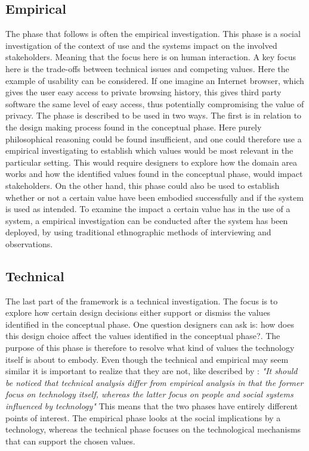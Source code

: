 \subsection{Empirical}
The phase that follows is often the empirical investigation. This phase is a social investigation of the context of use and the systems impact on the involved stakeholders. Meaning that the focus here is on human interaction. A key focus here is the trade-offs between technical issues and competing values. Here the example of usability can be considered. If one imagine an Internet browser, which gives the user easy access to private browsing history, this gives third party software the same level of easy access, thus potentially compromising the value of privacy.\newline
The phase is described to be used in two ways. The first is in relation to the design making process found in the conceptual phase. Here purely philosophical reasoning could be found insufficient, and one could therefore use a empirical investigating to establish which values would be most relevant in the particular setting. This would require designers to explore how the domain area works and how the identified values found in the conceptual phase, would impact stakeholders. \newline
On the other hand, this phase could also be used to establish whether or not a certain value have been embodied successfully and if the system is used as intended. To examine the impact a certain value has in the use of a system, a empirical investigation can be conducted after the system has been deployed, by using traditional ethnographic methods of interviewing and observations.

\subsection{Technical}
The last  part of the framework is a technical investigation. The focus is to explore how certain design decisions either support or dismiss the values identified in the conceptual phase. One question designers can ask is: how does this design choice affect the values identified in the conceptual phase?. The purpose of this phase is therefore to resolve what kind of values the technology itself is about to embody. Even though the technical and empirical may seem similar it is important to realize that they are not, like described by \citet[p. 67]{EthicsAndTechnologyDesign}: \textit{"It should be noticed that technical analysis differ from empirical analysis in that the former focus on technology itself, whereas the latter focus on people and social systems influenced by technology"}\newline
This means that the two phases have entirely different points of interest. The empirical phase looks at the social implications by a technology, whereas the technical phase focuses on the technological mechanisms that can support the chosen values. 
